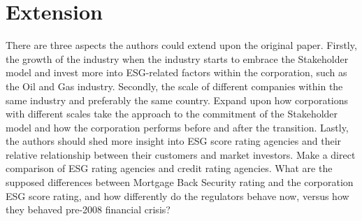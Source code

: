 \documentclass[a4paper, 12pt]{article}
\begin{document}
\section{Extension} \label{Extension}
\vspace{-10pt}
\hspace{10pt} There are three aspects the authors could extend upon the original paper. Firstly, the growth of the industry when the industry starts to embrace the Stakeholder model and invest more into ESG-related factors within the corporation, such as the Oil and Gas industry. Secondly, the scale of different companies within the same industry and preferably the same country. Expand upon how corporations with different scales take the approach to the commitment of the Stakeholder model and how the corporation performs before and after the transition. Lastly, the authors should shed more insight into ESG score rating agencies and their relative relationship between their customers and market investors. Make a direct comparison of ESG rating agencies and credit rating agencies. What are the supposed differences between Mortgage Back Security rating and the corporation ESG score rating, and how differently do the regulators behave now, versus how they behaved pre-2008 financial crisis? 

\newpage
\printbibliography %
\end{document}
